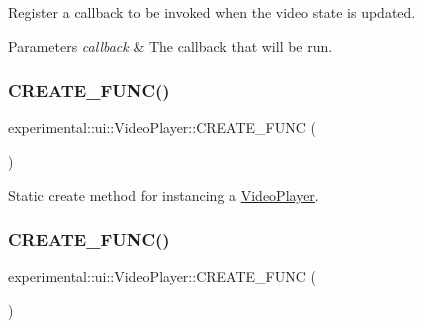 Register a callback to be invoked when the video state is updated.


\begin{DoxyParams}{Parameters}
{\em callback} & The callback that will be run. \\
\hline
\end{DoxyParams}
\mbox{\label{classexperimental_1_1ui_1_1VideoPlayer_a4030f5cbef6122fc7b377b21c641466b}} 
\subsubsection{\texorpdfstring{C\+R\+E\+A\+T\+E\+\_\+\+F\+U\+N\+C()}{CREATE\_FUNC()}\hspace{0.1cm}{\footnotesize\ttfamily [1/2]}}
{\footnotesize\ttfamily experimental\+::ui\+::\+Video\+Player\+::\+C\+R\+E\+A\+T\+E\+\_\+\+F\+U\+NC (\begin{DoxyParamCaption}\item[{\hyperlink{classexperimental_1_1ui_1_1VideoPlayer}{Video\+Player}}]{ }\end{DoxyParamCaption})}

Static create method for instancing a \hyperlink{classexperimental_1_1ui_1_1VideoPlayer}{Video\+Player}. \mbox{\label{classexperimental_1_1ui_1_1VideoPlayer_a4030f5cbef6122fc7b377b21c641466b}} 
\subsubsection{\texorpdfstring{C\+R\+E\+A\+T\+E\+\_\+\+F\+U\+N\+C()}{CREATE\_FUNC()}\hspace{0.1cm}{\footnotesize\ttfamily [2/2]}}
{\footnotesize\ttfamily experimental\+::ui\+::\+Video\+Player\+::\+C\+R\+E\+A\+T\+E\+\_\+\+F\+U\+NC (\begin{DoxyParamCaption}\item[{\hyperlink{classexperimental_1_1ui_1_1VideoPlayer}{Video\+Player}}]{ }\end{DoxyParamCaption})}

